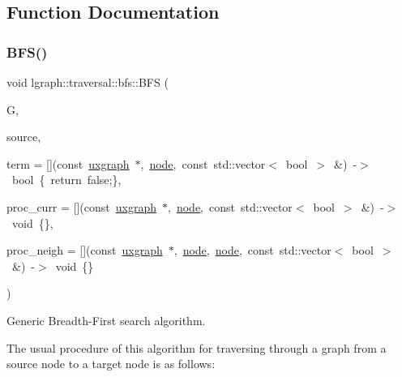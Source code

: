 \subsection{Function Documentation}
\mbox{\label{namespacelgraph_1_1traversal_1_1bfs_aacedf978cd98feee134e7e1e4e099f37}} 
\subsubsection{\texorpdfstring{B\+F\+S()}{BFS()}}
{\footnotesize\ttfamily void lgraph\+::traversal\+::bfs\+::\+B\+FS (\begin{DoxyParamCaption}\item[{const \hyperlink{classlgraph_1_1uxgraph}{uxgraph} $\ast$}]{G,  }\item[{\hyperlink{namespacelgraph_a397169dd66adf725210a30fb7251773e}{node}}]{source,  }\item[{\hyperlink{namespacelgraph_1_1traversal_1_1bfs_aa4593f688322861facc9f6851df5dd01}{bfs\+\_\+terminate}}]{term = {\ttfamily \mbox{[}\mbox{]}(const~\hyperlink{classlgraph_1_1uxgraph}{uxgraph}~$\ast$,~\hyperlink{namespacelgraph_a397169dd66adf725210a30fb7251773e}{node},~const~std\+:\+:vector$<$~bool~$>$~\&)~-\/$>$~bool~\{~return~false;\}},  }\item[{\hyperlink{namespacelgraph_1_1traversal_1_1bfs_afe3126045b7607bea056d250cfcc4aba}{bfs\+\_\+process\+\_\+current}}]{proc\+\_\+curr = {\ttfamily \mbox{[}\mbox{]}(const~\hyperlink{classlgraph_1_1uxgraph}{uxgraph}~$\ast$,~\hyperlink{namespacelgraph_a397169dd66adf725210a30fb7251773e}{node},~const~std\+:\+:vector$<$~bool~$>$~\&)~-\/$>$~void~\{\}},  }\item[{\hyperlink{namespacelgraph_1_1traversal_1_1bfs_ae7d59c83c3c9fd50ed4afd8ed781bca9}{bfs\+\_\+process\+\_\+neighbour}}]{proc\+\_\+neigh = {\ttfamily \mbox{[}\mbox{]}(const~\hyperlink{classlgraph_1_1uxgraph}{uxgraph}~$\ast$,~\hyperlink{namespacelgraph_a397169dd66adf725210a30fb7251773e}{node},~\hyperlink{namespacelgraph_a397169dd66adf725210a30fb7251773e}{node},~const~std\+:\+:vector$<$~bool~$>$~\&)~-\/$>$~void~\{\}} }\end{DoxyParamCaption})}



Generic Breadth-\/\+First search algorithm. 

The usual procedure of this algorithm for traversing through a graph from a source node to a target node is as follows\+:


